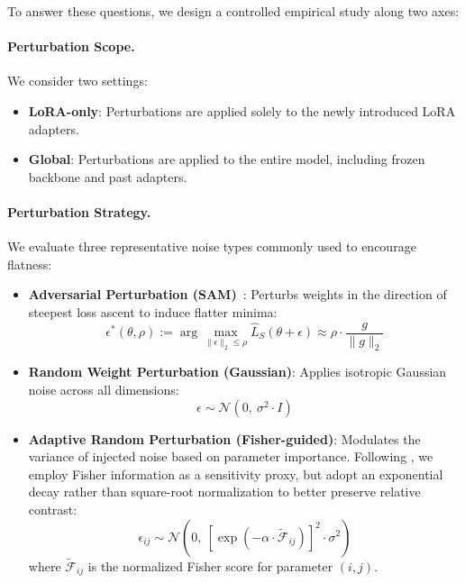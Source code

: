 \documentclass[letterpaper]{article} %
\begin{document}

To answer these questions, we design a controlled empirical study along two axes:
\paragraph{Perturbation Scope.} We consider two settings:
\begin{itemize}
    \item \textbf{LoRA-only}: Perturbations are applied solely to the newly introduced LoRA adapters.
    \item \textbf{Global}: Perturbations are applied to the entire model, including frozen backbone and past adapters.
\end{itemize}

\paragraph{Perturbation Strategy.} We evaluate three representative noise types commonly used to encourage flatness:

\begin{itemize}
    \item \textbf{Adversarial Perturbation (SAM)}~\cite{foretSharpnessAwareMinimizationEfficiently2021}: Perturbs weights in the direction of steepest loss ascent to induce flatter minima:
    \begin{equation}
    \epsilon^*(\theta, \rho) := \arg \max_{\|\epsilon\|_2 \leq \rho} \hat{L}_S(\theta + \epsilon) \approx \rho \cdot \frac{g}{\|g\|_2}
    \end{equation}

    \item \textbf{Random Weight Perturbation (Gaussian)}: Applies isotropic Gaussian noise across all dimensions:
    \begin{equation}
    \epsilon \sim \mathcal{N}(0,\ \sigma^2 \cdot I)
    \end{equation}

    \item \textbf{Adaptive Random Perturbation (Fisher-guided)}: Modulates the variance of injected noise based on parameter importance. Following \cite{liRevisitingRandomWeight2024}, we employ Fisher information as a sensitivity proxy, but adopt an exponential decay rather than square-root normalization to better preserve relative contrast:
    \begin{equation}
    \epsilon_{ij} \sim \mathcal{N}\left(0,\ \left[\exp\left(-\alpha \cdot \tilde{\mathcal{F}}_{ij} \right)\right]^2 \cdot \sigma^2 \right)
    \end{equation}
    where $\tilde{\mathcal{F}}_{ij}$ is the normalized Fisher score for parameter $(i,j)$.
\end{itemize}
\end{document}
